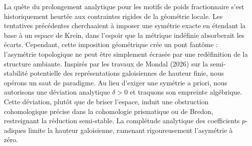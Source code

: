 \documentclass[
]{article}
\begin{document}
La quête du prolongement analytique pour les motifs de poids fractionnaire s'est historiquement heurtée aux contraintes rigides de la géométrie locale. Les tentatives précédentes cherchaaient à imposer une symétrie exacte en étendant la base à un espace de Krein, dans l'espoir que la métrique indéfinie absorberait les écarts. Cependant, cette imposition géométrique crée un pont fantôme : l'asymétrie topologique ne peut être simplement écrasée par une redéfinition de la structure ambiante. Inspirés par les travaux de Mondal (2026) sur la semi-stabilité potentielle des représentations galoisiennes de hauteur finie, nous opérons un saut de paradigme. Au lieu d'exiger une symétrie a priori, nous autorisons une déviation analytique $\delta > 0$ et traquons son empreinte algébrique. Cette déviation, plutôt que de briser l'espace, induit une obstruction cohomologique précise dans la cohomologie prismatique ou de Bredon, restreignant la réduction semi-stable. La complétude analytique des coefficients $p$-adiques limite la hauteur galoisienne, ramenant rigoureusement l'asymétrie à zéro.
\end{document}
